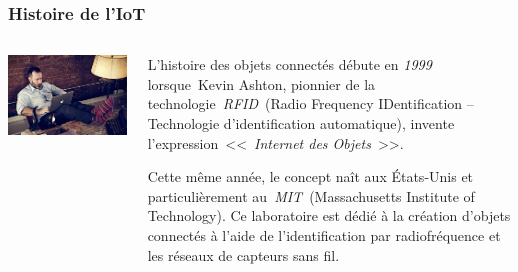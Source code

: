 \documentclass[aspectratio=169,utf8]{beamer}
\begin{document}
\begin{frame}
  \frametitle{Histoire de l'IoT}
  \begin{columns}
    \begin{column}{.3\textwidth}
      \includegraphics[width=\textwidth]{kevinashton.jpg}
    \end{column}
    \begin{column}{.7\textwidth}
      L’histoire des objets connectés débute en \emph{1999} lorsque Kevin Ashton, pionnier de la technologie \emph{RFID} (Radio Frequency IDentification – Technologie d’identification automatique), invente l’expression <<~\emph{Internet des Objets}~>>.

      Cette même année, le concept naît aux États-Unis et particulièrement au \emph{MIT} (Massachusetts Institute of Technology).
      Ce laboratoire est dédié à la création d’objets connectés à l’aide de l’identification par radiofréquence et les réseaux de capteurs sans fil.
    \end{column}
  \end{columns}
\end{frame}
\end{document}
